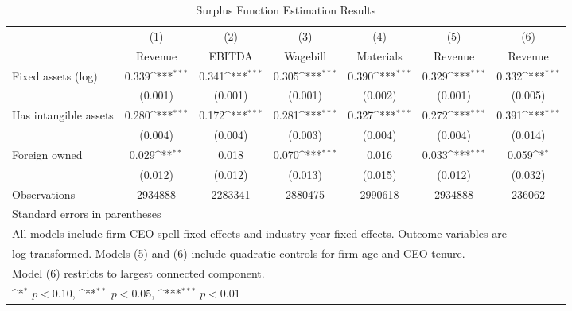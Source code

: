 \begin{table}[htbp]\centering
\def\sym#1{\ifmmode^{#1}\else\(^{#1}\)\fi}
\caption{Surplus Function Estimation Results}
\begin{tabular}{l*{6}{c}}
\toprule
                    &\multicolumn{1}{c}{(1)}&\multicolumn{1}{c}{(2)}&\multicolumn{1}{c}{(3)}&\multicolumn{1}{c}{(4)}&\multicolumn{1}{c}{(5)}&\multicolumn{1}{c}{(6)}\\
                    &\multicolumn{1}{c}{Revenue}&\multicolumn{1}{c}{EBITDA}&\multicolumn{1}{c}{Wagebill}&\multicolumn{1}{c}{Materials}&\multicolumn{1}{c}{Revenue}&\multicolumn{1}{c}{Revenue}\\
\midrule
Fixed assets (log)  &       0.339\sym{***}&       0.341\sym{***}&       0.305\sym{***}&       0.390\sym{***}&       0.329\sym{***}&       0.332\sym{***}\\
                    &     (0.001)         &     (0.001)         &     (0.001)         &     (0.002)         &     (0.001)         &     (0.005)         \\
\addlinespace
Has intangible assets&       0.280\sym{***}&       0.172\sym{***}&       0.281\sym{***}&       0.327\sym{***}&       0.272\sym{***}&       0.391\sym{***}\\
                    &     (0.004)         &     (0.004)         &     (0.003)         &     (0.004)         &     (0.004)         &     (0.014)         \\
\addlinespace
Foreign owned       &       0.029\sym{**} &       0.018         &       0.070\sym{***}&       0.016         &       0.033\sym{***}&       0.059\sym{*}  \\
                    &     (0.012)         &     (0.012)         &     (0.013)         &     (0.015)         &     (0.012)         &     (0.032)         \\
\midrule
Observations        &     2934888         &     2283341         &     2880475         &     2990618         &     2934888         &      236062         \\
\bottomrule
\multicolumn{7}{l}{\footnotesize Standard errors in parentheses}\\
\multicolumn{7}{l}{\footnotesize All models include firm-CEO-spell fixed effects and industry-year fixed effects. Outcome variables are}\\
\multicolumn{7}{l}{\footnotesize log-transformed. Models (5) and (6) include quadratic controls for firm age and CEO tenure.}\\
\multicolumn{7}{l}{\footnotesize Model (6) restricts to largest connected component.}\\
\multicolumn{7}{l}{\footnotesize \sym{*} \(p<0.10\), \sym{**} \(p<0.05\), \sym{***} \(p<0.01\)}\\
\end{tabular}
\end{table}
